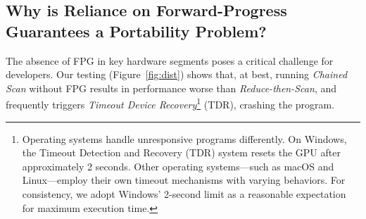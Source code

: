 \documentclass[acmsmall, manuscript, screen, review, anonymous]{acmart}
\begin{document}
\subsection{Why is Reliance on Forward-Progress Guarantees a Portability Problem?}
The absence of FPG in key hardware segments poses a critical challenge for developers. Our testing (Figure~\ref{fig:dist}) shows that, at best, running \emph{Chained Scan} without FPG results in performance worse than \emph{Reduce-then-Scan}, and frequently triggers \emph{Timeout Device Recovery}\label{sec:tdr}\footnote{Operating systems handle unresponsive programs differently. On Windows, the Timeout Detection and Recovery (TDR) system resets the GPU after approximately 2 seconds. Other operating systems---such as macOS and Linux---employ their own timeout mechanisms with varying behaviors. For consistency, we adopt Windows’ 2-second limit as a reasonable expectation for maximum execution time.} (TDR), crashing the program.
\end{document}

